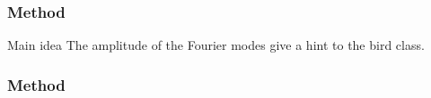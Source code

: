 \documentclass{beamer}
\begin{document}
\begin{frame}
    \frametitle{Method}
     \begin{block}{Main idea}
        The amplitude of the Fourier modes give a hint
        to the bird class.
    \end{block}
\end{frame}
\begin{frame}
    \frametitle{Method}
\end{frame}
\end{document}

